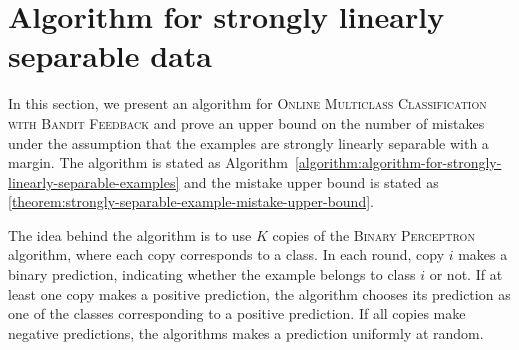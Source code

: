 \section{Algorithm for strongly linearly separable data}
\label{section:algorithm-for-strongly-linearly-separable-data}

In this section, we present an algorithm for \textsc{Online Multiclass
Classification with Bandit Feedback} and prove an upper bound on the number of
mistakes under the assumption that the examples are strongly linearly separable
with a margin. The algorithm is stated as
Algorithm~\ref{algorithm:algorithm-for-strongly-linearly-separable-examples} and
the mistake upper bound is stated as
\autoref{theorem:strongly-separable-example-mistake-upper-bound}.

The idea behind the algorithm is to use $K$ copies of the \textsc{Binary
Perceptron} algorithm, where each copy corresponds to a class.
In each round, copy $i$
makes a binary prediction, indicating whether the example belongs to class $i$ or not.
If at least one copy makes a positive prediction, the algorithm
chooses its prediction as one of the classes corresponding to a positive prediction.
If all copies make negative
predictions, the algorithms makes a prediction uniformly at random.



